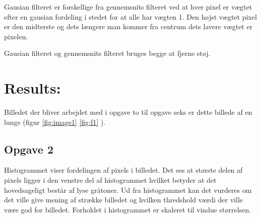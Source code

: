 \documentclass{article}
\begin{document}
Gausian filteret er forskellige fra gennemsnits filteret ved at hver pixel er vægtet efter en gausian fordeling i stedet for at alle har vægten 1. Den højst vægtet pixel er den midterste og dets længere man kommer fra centrum dets lavere vægtet er pixelen.\newline 

Gausian filteret og gennemsnits filteret bruges begge at fjerne støj.\newline 





\section{Results:} 



Billedet der bliver arbejdet med i opgave to til opgave seks er dette billede af en lunge (figur \ref{fig:image1} \ref{fig:f1} ).\newline 
\subsection{Opgave 2}
Histogrammet viser fordelingen af pixels i billedet. Det ses at største delen af pixels ligger i den venstre del af histogrammet hvilket betyder at det hovedsageligt består af lyse gråtoner. Ud fra histogrammet kan det vurderes om det ville give mening af strække billedet og hvilken thredshold værdi der ville være god for billedet. Forholdet i histogrammet er skaleret til vindue størrelsen. 
\end{document}
